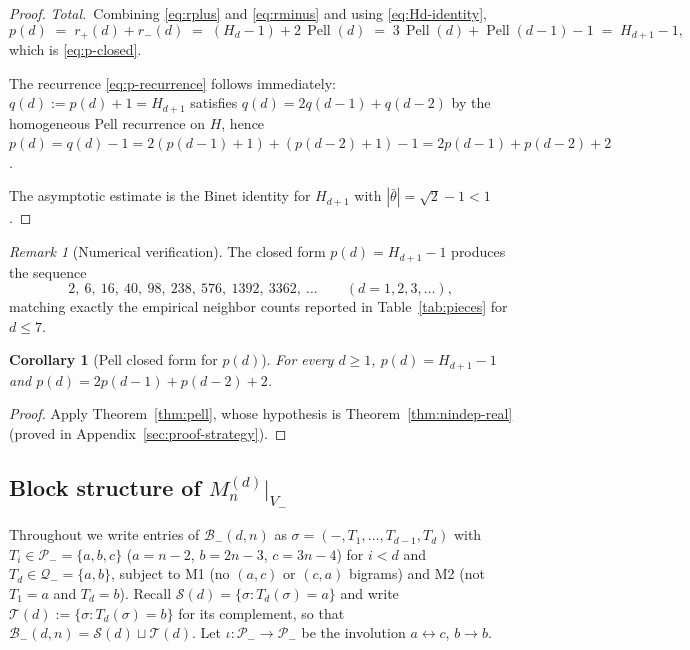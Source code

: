 \documentclass{amsart}
\newtheorem{corollary}[theorem]{Corollary}
\theoremstyle{definition}
\theoremstyle{remark}
\newtheorem{remark}[theorem]{Remark}
\DeclareMathOperator{\Pell}{Pell}
\begin{document}
\begin{proof}
\emph{Total.}\ Combining \eqref{eq:rplus} and \eqref{eq:rminus}
and using \eqref{eq:Hd-identity},
\begin{equation}\label{eq:p-from-rplus-rminus}
  p(d) \;=\; r_+(d) + r_-(d)
       \;=\; (H_d - 1) + 2\,\Pell(d)
       \;=\; 3\,\Pell(d) + \Pell(d-1) - 1
       \;=\; H_{d+1} - 1,
\end{equation}
which is \eqref{eq:p-closed}.

The recurrence \eqref{eq:p-recurrence} follows immediately:
$q(d) := p(d) + 1 = H_{d+1}$ satisfies
$q(d) = 2 q(d-1) + q(d-2)$ by the homogeneous Pell recurrence
on $H$, hence $p(d) = q(d) - 1 = 2(p(d-1) + 1) + (p(d-2) + 1) - 1
= 2 p(d-1) + p(d-2) + 2$.

The asymptotic estimate is the Binet identity for $H_{d+1}$ with
$|\bar\theta| = \sqrt 2 - 1 < 1$.

\end{proof}

\begin{remark}[Numerical verification]
\label{rem:p-numerics}
The closed form $p(d) = H_{d+1} - 1$ produces the sequence
\[
  2,\ 6,\ 16,\ 40,\ 98,\ 238,\ 576,\ 1392,\ 3362,\ \ldots
  \qquad (d = 1, 2, 3, \ldots),
\]
matching exactly the empirical neighbor counts reported in
Table~\ref{tab:pieces} for $d \le 7$.
\end{remark}

\begin{corollary}[Pell closed form for $p(d)$]
\label{cor:pell}
For every $d \ge 1$, $p(d) = H_{d+1} - 1$ and
$p(d) = 2 p(d-1) + p(d-2) + 2$.
\end{corollary}

\begin{proof}
Apply Theorem~\ref{thm:pell}, whose hypothesis
is Theorem~\ref{thm:nindep-real}
\textup{(}proved in
Appendix~\ref{sec:proof-strategy}\textup{)}.
\end{proof}

\subsection{Block structure of \texorpdfstring{$M_n^{(d)}|_{V_-}$}{the
minus-block}}
\label{ssec:Mmm-block}

Throughout we write entries of $\mathcal{B}_-(d, n)$ as
$\sigma = (-, T_1, \ldots, T_{d-1}, T_d)$ with
$T_i \in \mathcal{P}_- = \{a, b, c\}$ ($a = n-2$, $b = 2n-3$,
$c = 3n-4$) for $i < d$ and $T_d \in \mathcal{Q}_- = \{a, b\}$,
subject to M1 (no $(a, c)$ or $(c, a)$ bigrams) and M2 (not
$T_1 = a$ and $T_d = b$).  Recall
$\mathcal{S}(d) = \{\sigma : T_d(\sigma) = a\}$ and write
$\mathcal{T}(d) := \{\sigma : T_d(\sigma) = b\}$ for its
complement, so that $\mathcal{B}_-(d, n) = \mathcal{S}(d) \sqcup
\mathcal{T}(d)$.  Let $\iota : \mathcal{P}_- \to \mathcal{P}_-$
be the involution $a \leftrightarrow c$, $b \to b$.
\end{document}

